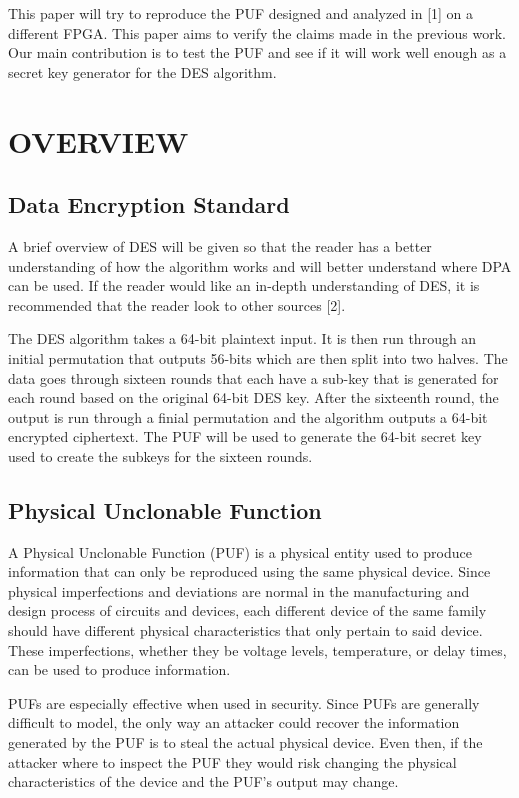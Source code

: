 \documentclass[letterpaper, 10 pt, conference]{ieeeconf}  %
\begin{document}
This paper will try to reproduce the PUF designed and analyzed in [1] on a different FPGA.  This paper aims to verify the claims made in the previous work.  Our main contribution is to test the PUF and see if it will work well enough as a secret key generator for the DES algorithm.


\section{OVERVIEW}

\subsection{Data Encryption Standard}

A brief overview of DES will be given so that the reader has a better understanding of how the algorithm works and will better understand where DPA can be used.  If the reader would like an in-depth understanding of DES, it is recommended that the reader look to other sources [2].

The DES algorithm takes a 64-bit plaintext input.  It is then run through an initial permutation that outputs 56-bits which are then split into two halves.  The data goes through sixteen rounds that each have a sub-key that is generated for each round based on the original 64-bit DES key.  After the sixteenth round, the output is run through a finial permutation and the algorithm outputs a 64-bit encrypted ciphertext.  The PUF will be used to generate the 64-bit secret key used to create the subkeys for the sixteen rounds.


\subsection{Physical Unclonable Function}

A Physical Unclonable Function (PUF) is a physical entity used to produce information that can only be reproduced using the same physical device.  Since physical imperfections and deviations are normal in the manufacturing and design process of circuits and devices, each different device of the same family should have different physical characteristics that only pertain to said device.  These imperfections, whether they be voltage levels, temperature, or delay times, can be used to produce information.

PUFs are especially effective when used in security.  Since PUFs are generally difficult to model, the only way an attacker could recover the information generated by the PUF is to steal the actual physical device.  Even then, if the attacker where to inspect the PUF they would risk changing the physical characteristics of the device and the PUF's output may change.
\end{document}
